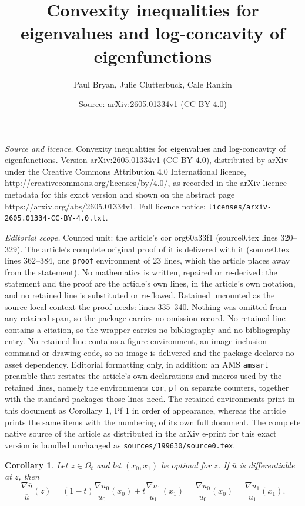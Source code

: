 \documentclass[10pt,a4paper]{amsart}
\title{Convexity inequalities for eigenvalues and log-concavity of eigenfunctions}
\author{Paul Bryan, Julie Clutterbuck, Cale Rankin}
\date{Source: arXiv:2605.01334v1 (CC BY 4.0)}
\newtheorem{cor}{Corollary}
\begin{document}
\maketitle

\noindent\emph{Source and licence.} Convexity inequalities for eigenvalues and log-concavity of eigenfunctions. Version arXiv:2605.01334v1 (CC BY 4.0), distributed by arXiv under the Creative Commons Attribution 4.0 International licence, http://creativecommons.org/licenses/by/4.0/, as recorded in the arXiv licence metadata for this exact version and shown on the abstract page https://arxiv.org/abs/2605.01334v1. Full licence notice: \texttt{licenses/arxiv-2605.01334-CC-BY-4.0.txt}.\par\smallskip

\noindent\textit{Editorial scope.} Counted unit: the article's cor org60a33f1 (source0.tex lines 320--329). The article's complete original proof of it is delivered with it (source0.tex lines 362--384, one \texttt{proof} environment of 23 lines, which the article places away from the statement). No mathematics is written, repaired or re-derived: the statement and the proof are the article's own lines, in the article's own notation, and no retained line is substituted or re-flowed.  Retained uncounted as the source-local context the proof needs: lines 335--340.  Nothing was omitted from any retained span, so the package carries no omission record.  No retained line contains a citation, so the wrapper carries no bibliography and no bibliography entry.  No retained line contains a figure environment, an image-inclusion command or drawing code, so no image is delivered and the package declares no asset dependency.  Editorial formatting only, in addition: an AMS \texttt{amsart} preamble that restates the article's own declarations and macros used by the retained lines, namely the environments \texttt{cor}, \texttt{pf} on separate counters, together with the standard packages those lines need.  The retained environments print in this document as Corollary 1, Pf 1 in order of appearance, whereas the article prints the same items with the numbering of its own full document.  The complete native source of the article as distributed in the arXiv e-print for this exact version is bundled unchanged as \texttt{sources/199630/source0.tex}.
\begin{cor}\label{eq:deriv-calc} Let $z \in \Omega_t$ and let $(x_0,x_1)$ be optimal
for $z$. If $\overline{u}$ is differentiable at $z$, then
\[ \frac{\nabla \overline{u}}{\overline{u}}(z) = (1-t)\frac{\nabla u_0}{u_0}(x_0) + t
\frac{\nabla u_1}{u_1}(x_1) = \frac{\nabla u_0}{u_0}(x_0) = \frac{\nabla u_1}{u_1}(x_1).
\]
\end{cor}
\end{document}
